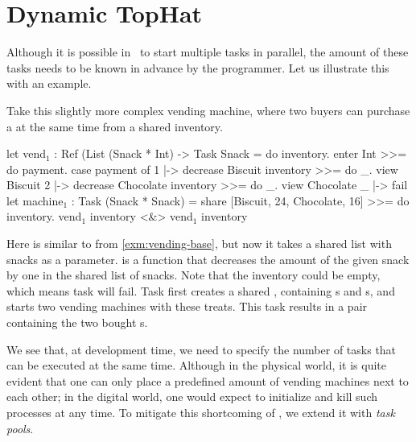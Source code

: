 
\section{Dynamic TopHat}
\label{sec:dyntophat}


Although it is possible in \TOPHAT\ to start multiple tasks in parallel,
the amount of these tasks needs to be known in advance by the programmer.
Let us illustrate this with an example.

\begin{example}
  \label{exm:vending-shared}
  Take this slightly more complex vending machine,
  where two buyers can purchase a  at the same time from a shared inventory.

  \begin{TASK}[emph={inventory,payment}]
    let vend$_1$ : Ref (List (Snack * Int) -> Task Snack =
      do inventory.
        enter Int >>= do payment.
        case payment of
          1 |-> decrease Biscuit inventory >>= do _.
               view Biscuit
          2 |-> decrease Chocolate inventory >>= do _.
               view Chocolate
          _ |-> fail
    let machine$_1$ : Task (Snack * Snack) =
      share [{Biscuit, 24}, {Chocolate, 16}] >>= do inventory.
      vend$_1$ inventory <&> vend$_1$ inventory
  \end{TASK}

  Here  is similar to  from \cref{exm:vending-base},
  but now it takes a shared list with snacks as a parameter.
   is a function that decreases the amount of the given snack by one in the shared list of snacks.
  Note that the inventory could be empty, which means task  will fail.
  Task  first creates a shared ,
  containing s and s,
  and starts two vending machines with these treats.
  This task results in a pair containing the two bought s.
\end{example}

We see that, at development time, we need to specify the number of  tasks that can be executed at the same time.
Although in the physical world, it is quite evident that one can only place a predefined amount of vending machines next to each other;
in the digital world, one would expect to initialize and kill such processes at any time.
To mitigate this shortcoming of \TOPHAT, we extend it with \emph{task pools}.


